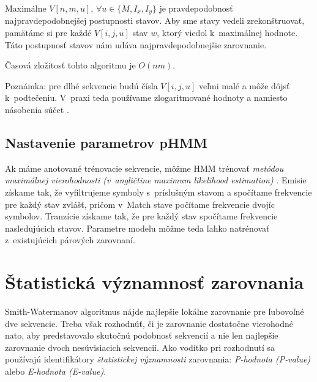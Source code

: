 Maximálne $V[n, m, u],\, \forall u \in \{M, I_x, I_y\}$ je pravdepodobnosť najpravdepodobnejšej postupnosti stavov.
Aby sme stavy vedeli zrekonštruovať, pamätáme si pre každé $V[i, j, u]$ stav $w$, ktorý viedol k~maximálnej hodnote. Táto postupnosť stavov nám udáva najpravdepodobnejšie zarovnanie.

Časová zložitosť tohto algoritmu je $O(nm)$.

Poznámka: pre dlhé sekvencie budú čísla $V[i, j, u]$ veľmi malé a môže dôjsť k~podtečeniu. V~praxi teda používame zlogaritmované hodnoty a namiesto násobenia súčet \cite{durbin}.

\subsection{Nastavenie parametrov pHMM}
\label{subsec:hmmtraining}
Ak máme anotované trénovacie sekvencie, môžme HMM trénovať \textit{metódou maximálnej vierohodnosti (v~angličtine maximum likelihood estimation)} \cite{ durbin, wiki:mle}.
Emisie získame tak, že vyfiltrujeme symboly s~príslušným stavom a spočítame frekvencie pre každý stav zvlášť, pričom v~Match stave počítame frekvencie dvojíc symbolov. Tranzície získame tak, že pre každý stav spočítame frekvencie nasledujúcich stavov. Parametre modelu môžme teda ľahko natrénovať z~existujúcich párových zarovnaní.

\section[Štat. významnosť ]{Štatistická významnosť zarovnania}
Smith-Watermanov algoritmus nájde najlepšie lokálne zarovnanie pre ľubovoľné dve sekvencie. Treba však rozhodnúť, či je zarovnanie dostatočne vierohodné nato, aby predstavovalo skutočnú podobnosť sekvencií a nie len najlepšie zarovnanie dvoch nesúvisiacich sekvencií.
Ako vodítko pri rozhodnutí sa používajú identifikátory \textit{štatistickej významnosti} zarovnania: \textit{P-hodnota (P-value)} alebo \textit{E-hodnota (E-value)}.

